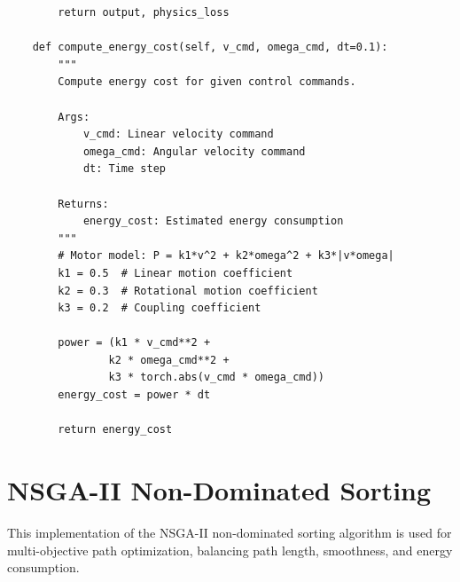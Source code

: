 \begin{lstlisting}
        return output, physics_loss
    
    def compute_energy_cost(self, v_cmd, omega_cmd, dt=0.1):
        """
        Compute energy cost for given control commands.
        
        Args:
            v_cmd: Linear velocity command
            omega_cmd: Angular velocity command
            dt: Time step
            
        Returns:
            energy_cost: Estimated energy consumption
        """
        # Motor model: P = k1*v^2 + k2*omega^2 + k3*|v*omega|
        k1 = 0.5  # Linear motion coefficient
        k2 = 0.3  # Rotational motion coefficient
        k3 = 0.2  # Coupling coefficient
        
        power = (k1 * v_cmd**2 + 
                k2 * omega_cmd**2 + 
                k3 * torch.abs(v_cmd * omega_cmd))
        energy_cost = power * dt
        
        return energy_cost
\end{lstlisting}

\section{NSGA-II Non-Dominated Sorting}
\label{sec:nsga2_sorting}

This implementation of the NSGA-II non-dominated sorting algorithm is used for multi-objective path optimization, balancing path length, smoothness, and energy consumption.

